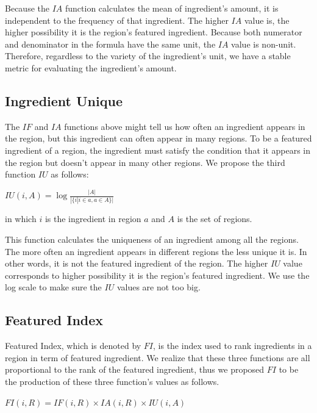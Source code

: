 \documentclass{sig-alternate}
\begin{document}
Because the $IA$ function calculates the mean of ingredient's amount, it is independent to the frequency of that ingredient. The higher $IA$ value is, the higher possibility it is the region's featured ingredient. Because both numerator and denominator in the formula have the same unit, the $IA$ value is non-unit. Therefore, regardless to the variety of the ingredient's unit, we have a stable metric for evaluating the ingredient's amount.

\subsection{Ingredient Unique}

The $IF$ and $IA$ functions above might tell us how often an ingredient appears in the region, but this ingredient can often appear in many regions. To be a featured ingredient of a region, the ingredient must satisfy the condition that it appears in the region but doesn't appear in many other regions. We propose the third function $IU$ as follows: 
\begin{center}
\smallskip
$IU(i,A)=  \log{\displaystyle \frac{\displaystyle |A|}{\displaystyle |\{i|i \in a, a \in A \}|}}$
\smallskip
\end{center}

in which $i$ is the ingredient in region $a$ and $A$ is the set of regions.

This function calculates the uniqueness of an ingredient among all the regions. The more often an ingredient appears in different regions the less unique it is. In other words, it is not the featured ingredient of the region. The higher $IU$ value corresponds to higher possibility it is the region's featured ingredient. We use the log scale to make sure the $IU$ values are not too big.

\subsection{Featured Index}

Featured Index, which is denoted by $FI$, is the index used to rank ingredients in a region in term of featured ingredient. We realize that these three functions are all proportional to the rank of the featured ingredient, thus we proposed $FI$ to be the production of these three function's values as follows.
\begin{center}
\smallskip
$FI(i,R)= IF(i,R) \times IA(i,R) \times IU(i,A)$ 
\smallskip
\end{center}
\end{document}
